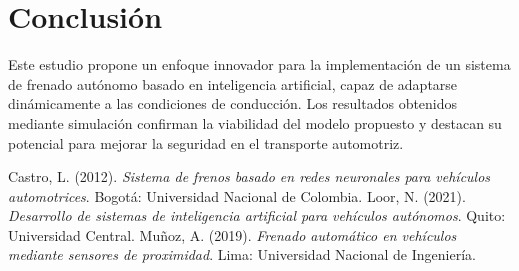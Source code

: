 \documentclass[9pt,twocolumn,twoside]{article} %
\begin{document}
\section{Conclusión}
Este estudio propone un enfoque innovador para la implementación de un sistema de frenado autónomo basado en inteligencia artificial, capaz de adaptarse dinámicamente a las condiciones de conducción. Los resultados obtenidos mediante simulación confirman la viabilidad del modelo propuesto y destacan su potencial para mejorar la seguridad en el transporte automotriz.

\begin{thebibliography}{X}

Castro, L. (2012). \textit{Sistema de frenos basado en redes neuronales para vehículos automotrices}. Bogotá: Universidad Nacional de Colombia.
Loor, N. (2021). \textit{Desarrollo de sistemas de inteligencia artificial para vehículos autónomos}. Quito: Universidad Central.
Muñoz, A. (2019). \textit{Frenado automático en vehículos mediante sensores de proximidad}. Lima: Universidad Nacional de Ingeniería.
\end{thebibliography}
\end{document}
